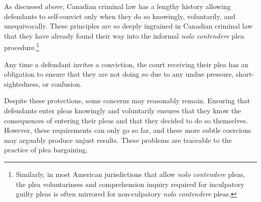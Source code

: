 As discussed above, Canadian criminal law has a lengthy history allowing defendants to self-convict only when they do so knowingly, voluntarily, and unequivocally. These principles are so deeply ingrained in Canadian criminal law that they have already found their way into the informal \textit{nolo contendere} plea procedure.\footnote{Similarly, in most American jurisdictions that allow \textit{nolo contendere} pleas, the plea voluntariness and comprehension inquiry required for inculpatory guilty pleas is often mirrored for non-culpatory \textit{nolo contendere} pleas.} 

Any time a defendant invites a conviction, the court receiving their plea has an obligation to ensure that they are not doing so due to any undue pressure, short-sightedness, or confusion.

Despite these protections, some concerns may reasonably remain. Ensuring that defendants enter pleas knowingly and voluntarily ensures that they know the consequences of entering their pleas and that they decided to do so themselves. However, these requirements can only go so far, and these more subtle coercions may arguably produce unjust results. These problems are traceable to the practice of plea bargaining.